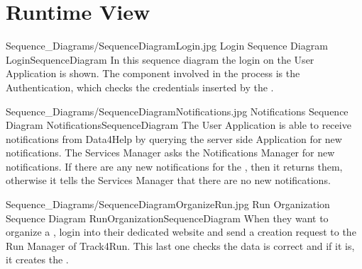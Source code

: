 \documentclass[../../DD.tex]{subfiles}
\begin{document}
\section{Runtime View\label{sect:2.4}}


	\image {13cm} {Sequence_Diagrams/SequenceDiagramLogin.jpg} {Login Sequence Diagram} {LoginSequenceDiagram}
	In this sequence diagram the  login on the User Application is shown. The component involved in the process is the Authentication, which checks the credentials inserted by the .

	\image {13cm} {Sequence_Diagrams/SequenceDiagramNotifications.jpg} {Notifications Sequence Diagram} {NotificationsSequenceDiagram}
	The User Application is able to receive notifications from Data4Help by querying the server side Application for new notifications. The Services Manager asks the Notifications Manager for new notifications. If there are any new notifications for the , then it returns them, otherwise it tells the Services Manager that there are no new notifications.


	




	

	\image {13cm} {Sequence_Diagrams/SequenceDiagramOrganizeRun.jpg} {Run Organization Sequence Diagram} {RunOrganizationSequenceDiagram}
	When they want to organize a ,  login into their dedicated website and send a  creation request to the Run Manager of Track4Run. This last one checks the  data is correct and if it is, it creates the .

\end{document}

